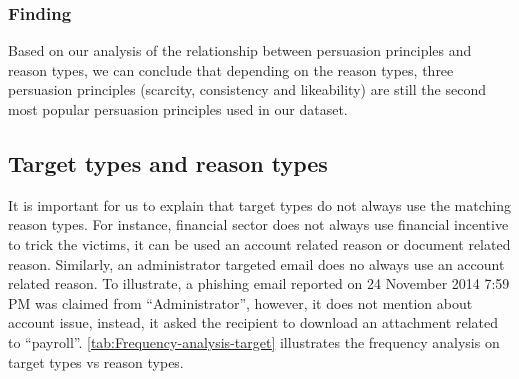 \subsubsection{\label{sub:Finding-1}Finding}

Based on our analysis of the relationship between persuasion principles
and reason types, we can conclude that depending on the reason types,
three persuasion principles (scarcity, consistency and likeability)
are still the second most popular persuasion principles used in our
dataset.


\subsection{Target types and reason types}

It is important for us to explain that target types do not always
use the matching reason types. For instance, financial sector does
not always use financial incentive to trick the victims, it can be
used an account related reason or document related reason. Similarly,
an administrator targeted email does no always use an account related
reason. To illustrate, a phishing email reported on 24 November 2014
7:59 PM was claimed from ``Administrator'', however, it does not
mention about account issue, instead, it asked the recipient to download
an attachment related to ``payroll''. \autoref{tab:Frequency-analysis-target}
illustrates the frequency analysis on target types vs reason types. 

